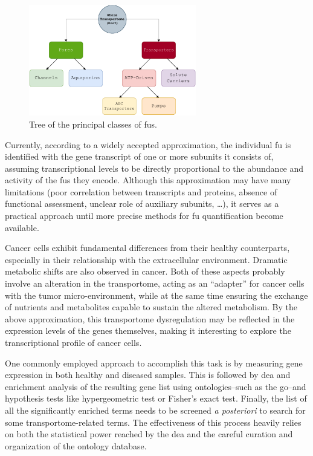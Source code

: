 \begin{figure}
    \centering
    \includegraphics[width=0.65\textwidth]{resources/images/BasicTree.pdf}
    \caption{Tree of the principal classes of \glspl{fu}.}
    \label{fig:BasicTree}
\end{figure}

Currently, according to a widely accepted approximation, the individual \gls{fu} is identified with the gene transcript of one or more subunits it consists of, assuming transcriptional levels to be directly proportional to the abundance and activity of the \glspl{fu} they encode.
Although this approximation may have many limitations (poor correlation between transcripts and proteins, absence of functional assessment, unclear role of auxiliary subunits, \ldots), it serves as a practical approach until more precise methods for \gls{fu} quantification become available.


Cancer cells exhibit fundamental differences from their healthy counterparts, especially in their relationship with the extracellular environment.
Dramatic metabolic shifts are also observed in cancer.
Both of these aspects probably involve an alteration in the transportome, acting as an ``adapter'' for cancer cells with the tumor micro-environment, while at the same time ensuring the exchange of nutrients and metabolites capable to sustain the altered metabolism.
By the above approximation, this transportome dysregulation may be reflected in the expression levels of the genes themselves, making it interesting to explore the transcriptional profile of cancer cells.

One commonly employed approach to accomplish this task is by measuring gene expression in both healthy and diseased samples.
This is followed by \gls{dea} and enrichment analysis of the resulting gene list using ontologies--such as the \gls{go}--and hypothesis tests like hypergeometric test or Fisher's exact test.
Finally, the list of all the significantly enriched terms needs to be screened \textit{a posteriori} to search for some transportome-related terms.
The effectiveness of this process heavily relies on both the statistical power reached by the \gls{dea} and the careful curation and organization of the ontology database.


